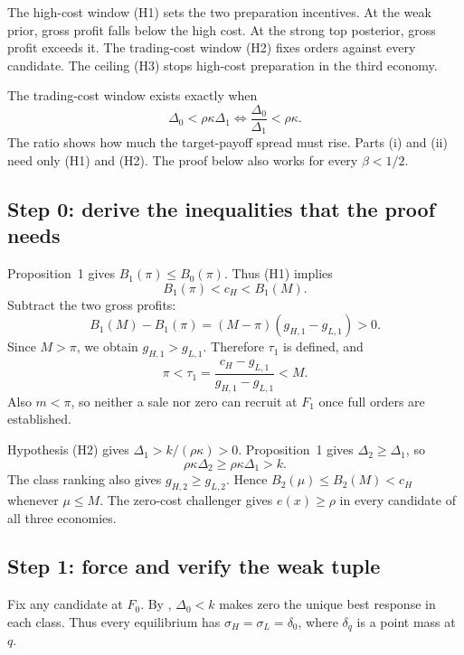 The high-cost window (H1) sets the two preparation incentives.
At the weak prior, gross profit falls below the high cost.
At the strong top posterior, gross profit exceeds it.
The trading-cost window (H2) fixes orders against every candidate.
The ceiling (H3) stops high-cost preparation in the third economy.

The trading-cost window exists exactly when
\[
\Delta_0<\rho\kappa\Delta_1
\iff \frac{\Delta_0}{\Delta_1}<\rho\kappa.
\]
The ratio shows how much the target-payoff spread must rise.
Parts (i) and (ii) need only (H1) and (H2).
The proof below also works for every $\beta<1/2$.

\subsection{Step 0: derive the inequalities that the proof needs}
\label{sec:06_main_result-implied}

Proposition~1 gives $B_1(\pi)\le B_0(\pi)$.
Thus (H1) implies
\[
B_1(\pi)<c_H<B_1(M).
\]
Subtract the two gross profits:
\[
B_1(M)-B_1(\pi)=(M-\pi)(g_{H,1}-g_{L,1})>0.
\]
Since $M>\pi$, we obtain $g_{H,1}>g_{L,1}$.
Therefore $\tau_1$ is defined, and
\[
\pi<\tau_1=\frac{c_H-g_{L,1}}{g_{H,1}-g_{L,1}}<M.
\]
Also $m<\pi$, so neither a sale nor zero can recruit at $F_1$ once full orders are established.

Hypothesis (H2) gives $\Delta_1>k/(\rho\kappa)>0$.
Proposition~1 gives $\Delta_2\ge\Delta_1$, so
\[
\rho\kappa\Delta_2\ge\rho\kappa\Delta_1>k.
\]
The class ranking also gives $g_{H,2}\ge g_{L,2}$.
Hence $B_2(\mu)\le B_2(M)<c_H$ whenever $\mu\le M$.
The zero-cost challenger gives $e(x)\ge\rho$ in every candidate of all three economies.

\subsection{Step 1: force and verify the weak tuple}
\label{sec:06_main_result-weak}

Fix any candidate at $F_0$.
By , $\Delta_0<k$ makes zero the unique best response in each class.
Thus every equilibrium has $\sigma_H=\sigma_L=\delta_0$, where $\delta_q$ is a point mass at $q$.


